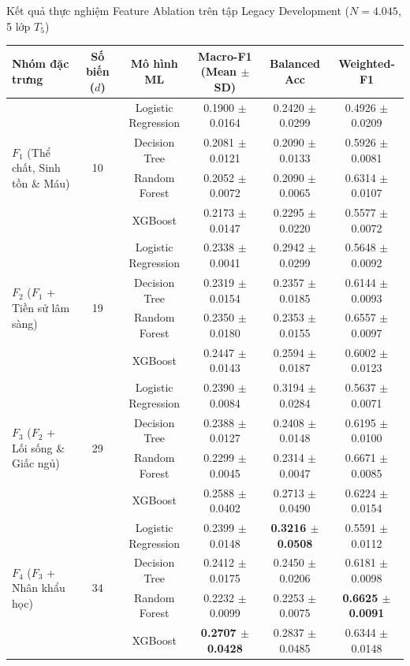 \begin{table}{Kết quả thực nghiệm Feature Ablation trên tập Legacy Development ($N = 4.045$, 5 lớp $T_5$)}
\centering
\small
\label{tab:ablation-results}
\begin{tabular}{l c c c c c}
\toprule
\textbf{Nhóm đặc trưng} & \textbf{Số biến ($d$)} & \textbf{Mô hình ML} & \textbf{Macro-F1 (Mean $\pm$ SD)} & \textbf{Balanced Acc} & \textbf{Weighted-F1} \\
\midrule
\multirow{4}{*}{\textbf{$F_1$} (Thể chất, Sinh tồn \& Máu)} & \multirow{4}{*}{10} 
  & Logistic Regression & 0.1900 $\pm$ 0.0164 & 0.2420 $\pm$ 0.0299 & 0.4926 $\pm$ 0.0209 \\
& & Decision Tree        & 0.2081 $\pm$ 0.0121 & 0.2090 $\pm$ 0.0133 & 0.5926 $\pm$ 0.0081 \\
& & Random Forest       & 0.2052 $\pm$ 0.0072 & 0.2090 $\pm$ 0.0065 & 0.6314 $\pm$ 0.0107 \\
& & XGBoost             & 0.2173 $\pm$ 0.0147 & 0.2295 $\pm$ 0.0220 & 0.5577 $\pm$ 0.0072 \\
\midrule
\multirow{4}{*}{\textbf{$F_2$} ($F_1$ + Tiền sử lâm sàng)} & \multirow{4}{*}{19} 
  & Logistic Regression & 0.2338 $\pm$ 0.0041 & 0.2942 $\pm$ 0.0299 & 0.5648 $\pm$ 0.0092 \\
& & Decision Tree        & 0.2319 $\pm$ 0.0154 & 0.2357 $\pm$ 0.0185 & 0.6144 $\pm$ 0.0093 \\
& & Random Forest       & 0.2350 $\pm$ 0.0180 & 0.2353 $\pm$ 0.0155 & 0.6557 $\pm$ 0.0097 \\
& & XGBoost             & 0.2447 $\pm$ 0.0143 & 0.2594 $\pm$ 0.0187 & 0.6002 $\pm$ 0.0123 \\
\midrule
\multirow{4}{*}{\textbf{$F_3$} ($F_2$ + Lối sống \& Giấc ngủ)} & \multirow{4}{*}{29} 
  & Logistic Regression & 0.2390 $\pm$ 0.0084 & 0.3194 $\pm$ 0.0284 & 0.5637 $\pm$ 0.0071 \\
& & Decision Tree        & 0.2388 $\pm$ 0.0127 & 0.2408 $\pm$ 0.0148 & 0.6195 $\pm$ 0.0100 \\
& & Random Forest       & 0.2299 $\pm$ 0.0045 & 0.2314 $\pm$ 0.0047 & 0.6671 $\pm$ 0.0085 \\
& & XGBoost             & 0.2588 $\pm$ 0.0402 & 0.2713 $\pm$ 0.0490 & 0.6224 $\pm$ 0.0154 \\
\midrule
\multirow{4}{*}{\textbf{$F_4$} ($F_3$ + Nhân khẩu học)} & \multirow{4}{*}{34} 
  & Logistic Regression & 0.2399 $\pm$ 0.0148 & \textbf{0.3216 $\pm$ 0.0508} & 0.5591 $\pm$ 0.0112 \\
& & Decision Tree        & 0.2412 $\pm$ 0.0175 & 0.2450 $\pm$ 0.0206 & 0.6181 $\pm$ 0.0098 \\
& & Random Forest       & 0.2232 $\pm$ 0.0099 & 0.2253 $\pm$ 0.0075 & \textbf{0.6625 $\pm$ 0.0091} \\
& & XGBoost             & \textbf{0.2707 $\pm$ 0.0428} & 0.2837 $\pm$ 0.0485 & 0.6344 $\pm$ 0.0148 \\
\bottomrule
\end{tabular}
\end{table}
